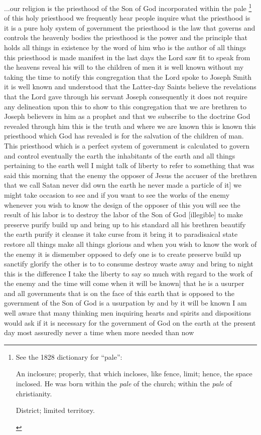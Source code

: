 					...our religion is the priesthood of the Son of God incorporated within the pale%
						\footnote{%
							\label{EMS-1864-BY-31-JUL-1864-pale}%
							See the 1828 dictionary for ``pale'':
								\begin{compactitem}
									\item[3] An inclosure; properly, that which incloses, like fence, limit; hence, the space inclosed. He was born within the \textit{pale} of the church; within the \textit{pale} of christianity.
									\item[4] District; limited territory.
								\end{compactitem}
							}
					of this holy priesthood we frequently hear people inquire what the priesthood is it is a pure holy system of government the priesthood is the law that governs and controls the heavenly bodies the priesthood is the power and the principle that holds all things in existence by the word of him who is the author of all things this priesthood is made manifest in the last days the Lord saw fit to speak from the heavens reveal his will to the children of men it is well known without my taking the time to notify this congregation that the Lord spoke to Joseph Smith it is well known and understood that the Latter-day Saints believe the revelations that the Lord gave through his servant Joseph consequently it does not require any delineation upon this to show to this congregation that we are brethren to Joseph believers in him as a prophet and that we subscribe to the doctrine God revealed through him this is the truth and where we are known this is known this priesthood which God has revealed is for the salvation of the children of man. This priesthood which is a perfect system of government is calculated to govern and control eventually the earth the inhabitants of the earth and all things pertaining to the earth well I might talk of liberty to refer to something that was said this morning that the enemy the opposer of Jesus the accuser of the brethren that we call Satan never did own the earth he never made a particle of it] we might take occasion to see and if you want to see the works of the enemy whenever you wish to know the design of the opposer of this you will see the result of his labor is to destroy the labor of the Son of God [illegible] to make preserve purify build up and bring up to his standard all his brethren beautify the earth purify it cleanse it take curse from it bring it to paradisaical state restore all things make all things glorious and when you wish to know the work of the enemy it is dismember opposed to defy one is to create preserve build up sanctify glorify the other is to to consume destroy waste away and bring to night this is the difference I take the liberty to say so much with regard to the work of the enemy and the time will come when it will be known] that he is a usurper and all governments that is on the face of this earth that is opposed to the government of the Son of God is a usurpation by and by it will be known I am well aware that many thinking men inquiring hearts and spirits and dispositions would ask if it is necessary for the government of God on the earth at the present day most assuredly never a time when more needed than now 